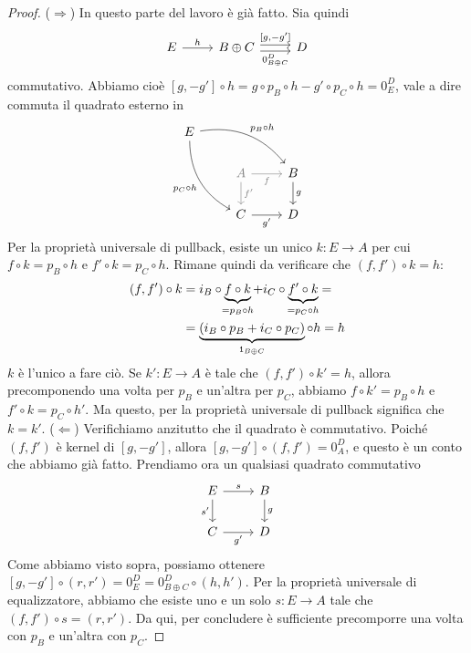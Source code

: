 \begin{proof}
  (\(\Rightarrow\)) In questo parte del lavoro è già fatto. Sia quindi
  \[
    \begin{tikzcd}
      E \ar["{h}", r] & B \oplus C \ar["{[g, -g']}", r, shift left]
      \ar["{0_{B \oplus C}^D}", r, shift right, swap] & D
    \end{tikzcd}
  \]
  commutativo. Abbiamo cioè
  \([g, -g'] \circ h = g \circ p_B \circ h - g' \circ p_C \circ h =
  0_E^D\), vale a dire commuta il quadrato esterno in
  \[
    \begin{tikzcd}
      E \ar["{p_B \circ h}", drr, bend left] \ar["{p_C \circ h}", ddr,
      swap,
      bend right] \\
      & {\color{gray} A} \ar["{f}" gray, gray, r, swap] \ar["{f'}" gray, gray, d] & B \ar["{g}", d] \\
      & C \ar["{g'}", r, swap] & D
    \end{tikzcd}
  \]
  Per la proprietà universale di pullback, esiste un unico
  \(k : E \to A\) per cui \(f \circ k = p_B \circ h\) e
  \(f' \circ k = p_C \circ h\). Rimane quindi da verificare che
  \((f, f') \circ k = h\):
  \begin{align*}
    (f, f') \circ k &= i_B \circ \underbrace{f \circ
                      k}_{\crampedclap{=p_B \circ h}} + i_C \circ \underbrace{f'
                      \circ k}_{\crampedclap{=p_C \circ h}} = \\
                    &= \underbrace{(i_B \circ p_B + i_C \circ
                      p_C)}_{\id_{B \oplus C}} \circ h = h
  \end{align*}
  \(k\) è l'unico a fare ciò. Se \(k' : E \to A\) è tale che
  \((f, f') \circ k' = h\), allora precomponendo una volta per \(p_B\) e
  un'altra per \(p_C\), abbiamo \(f \circ k' = p_B \circ h\) e
  \(f' \circ k = p_C \circ h'\). Ma questo, per la proprietà universale
  di pullback significa che \(k = k'\).\newline
  (\(\Leftarrow\)) Verifichiamo anzitutto che il quadrato è
  commutativo. Poiché \((f, f')\) è kernel di \([g, -g']\), allora
  \([g, -g'] \circ (f, f') = 0_A^D\), e questo è un conto che abbiamo
  già fatto. Prendiamo ora un qualsiasi quadrato commutativo
  \[
    \begin{tikzcd}
      E \ar["{s}", r] \ar["{s'}", d, swap] & B \ar["{g}", d] \\
      C \ar["{g'}", r, swap] & D
    \end{tikzcd}
  \]
  Come abbiamo visto sopra, possiamo ottenere
  \([g, -g'] \circ (r, r') = 0_E^D = 0_{B \oplus C}^D \circ (h,
  h')\). Per la proprietà universale di equalizzatore, abbiamo che
  esiste uno e un solo \(s : E \to A\) tale che
  \((f, f') \circ s = (r, r')\). Da qui, per concludere è sufficiente
  precomporre una volta con \(p_B\) e un'altra con \(p_C\). %
\end{proof}


